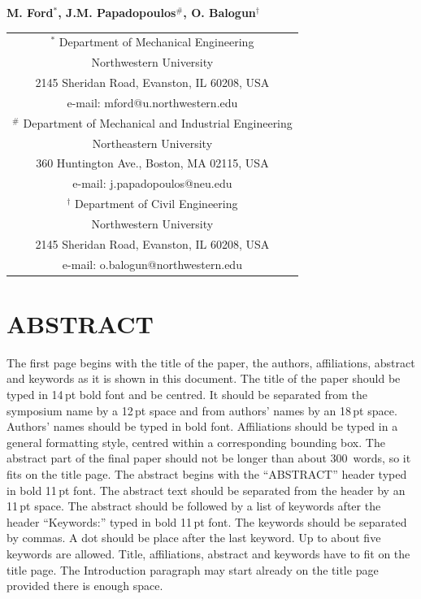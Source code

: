 \documentclass{bmd2016p}
\begin{document}
\begin{center}
\end{center}

\begin{center}
\normalsize{\bf{M. Ford$^{*}$, J.M. Papadopoulos$^\#$, 
            O. Balogun$^\dag$}}
\end{center} 

\begin{center}
\begin{tabular}{c}
$^*$ Department of Mechanical Engineering\\
Northwestern University\\
2145 Sheridan Road, Evanston, IL 60208, USA\\
e-mail: mford@u.northwestern.edu\\[2.5ex]

$^\#$ Department of Mechanical and Industrial Engineering\\
Northeastern University\\
360 Huntington Ave., Boston, MA 02115, USA\\
e-mail: j.papadopoulos@neu.edu\\[2.5ex]

$^\dag$ Department of Civil Engineering\\
Northwestern University\\
2145 Sheridan Road, Evanston, IL 60208, USA\\
e-mail: o.balogun@northwestern.edu\\
\end{tabular}
\end{center}


\section*{ABSTRACT}

The first page begins with the title of the paper, the authors, affiliations, 
abstract and keywords as it is shown in this document. The title of the paper 
should be typed in 14\,pt bold font and be centred. It should be separated 
from the symposium name by a 12\,pt space and from authors' names by an 18\,pt 
space. Authors' names should be typed in bold font. Affiliations should be 
typed in a general formatting style, centred within a corresponding bounding 
box. The abstract part of the final paper should not be longer than about 
300~words, so it fits on the title page. The abstract begins with the 
``ABSTRACT'' header typed in bold 11\,pt font. The abstract text should be 
separated from the header by an 11\,pt space. The abstract should be followed 
by a list of keywords after the header ``Keywords:'' typed in bold 11\,pt 
font. The keywords should be separated by commas. A dot should be place after 
the last keyword. Up to about five keywords are allowed. Title, affiliations, 
abstract and keywords have to fit on the title page. The Introduction 
paragraph may start already on the title page provided there is enough space.
\end{document}
